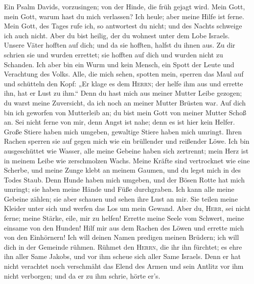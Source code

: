  Ein Psalm Davids, vorzusingen; von der Hinde, die früh
gejagt wird.  Mein Gott, mein Gott, warum hast du mich
verlassen? Ich heule; aber meine Hilfe ist ferne.  Mein
Gott, des Tages rufe ich, so antwortest du nicht; und des Nachts
schweige ich auch nicht.  Aber du bist heilig, der du
wohnest unter dem Lobe Israels.  Unsere Väter hofften auf
dich; und da sie hofften, halfst du ihnen aus.  Zu dir
schrien sie und wurden errettet; sie hofften auf dich und wurden nicht
zu Schanden.  Ich aber bin ein Wurm und kein Mensch, ein
Spott der Leute und Verachtung des Volks.  Alle, die mich
sehen, spotten mein, sperren das Maul auf und schütteln den Kopf:
 „Er klage es dem \textsc{Herrn}; der helfe ihm aus und
errette ihn, hat er Lust zu ihm.``  Denn du hast mich aus
meiner Mutter Leibe gezogen; du warst meine Zuversicht, da ich noch an
meiner Mutter Brüsten war.  Auf dich bin ich geworfen von
Mutterleib an; du bist mein Gott von meiner Mutter Schoß an.
 Sei nicht ferne von mir, denn Angst ist nahe; denn es
ist hier kein Helfer.  Große Stiere haben mich umgeben,
gewaltige Stiere haben mich umringt.  Ihren Rachen
sperren sie auf gegen mich wie ein brüllender und reißender Löwe.
 Ich bin ausgeschüttet wie Wasser, alle meine Gebeine
haben sich zertrennt; mein Herz ist in meinem Leibe wie zerschmolzen
Wachs.  Meine Kräfte sind vertrocknet wie eine Scherbe,
und meine Zunge klebt an meinem Gaumen, und du legst mich in des Todes
Staub.  Denn Hunde haben mich umgeben, und der Bösen
Rotte hat mich umringt; sie haben meine Hände und Füße durchgraben.
 Ich kann alle meine Gebeine zählen; sie aber schauen und
sehen ihre Lust an mir.  Sie teilen meine Kleider unter
sich und werfen das Los um mein Gewand.  Aber du,
\textsc{Herr}, sei nicht ferne; meine Stärke, eile, mir zu helfen!
 Errette meine Seele vom Schwert, meine einsame von den
Hunden!  Hilf mir aus dem Rachen des Löwen und errette
mich von den Einhörnern!  Ich will deinen Namen predigen
meinen Brüdern; ich will dich in der Gemeinde rühmen. 
Rühmet den \textsc{Herrn}, die ihr ihn fürchtet; es ehre ihn aller Same
Jakobs, und vor ihm scheue sich aller Same Israels.  Denn
er hat nicht verachtet noch verschmäht das Elend des Armen und sein
Antlitz vor ihm nicht verborgen; und da er zu ihm schrie, hörte er's.
